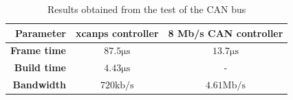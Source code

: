 \begin{table}[h!]
	\centering
	\begin{tabular}{r | c | c}
		\textbf{Parameter} & \textbf{xcanps controller} & \textbf{8 Mb/s CAN controller} \\
		\hline
		\textbf{Frame time} & $87.5 \si{\micro\second}$ & $13.7\si{\micro\second}$ \\
		\textbf{Build time} & $4.43 \si{\micro\second}$ & - \\
		\textbf{Bandwidth} & $720 \mathrm{kb/s}$ & $4.61 \mathrm{Mb/s}$
	\end{tabular}
	\caption{Results obtained from the test of the CAN bus}
	\label{tab:CAN_test_conclusion}
\end{table}

